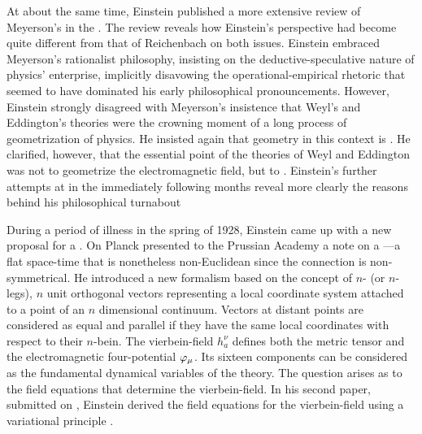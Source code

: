 \documentclass[final]{article}
\renewcommand{\me}{;~m.e.{}}
\newcommand{\nbein}{$n$-bein\xspace}
\newcommand{\vbein}{vierbein\xspace}
\newcommand{\hbein}{\ensuremath{h_{a}^{\nu}}\xspace}
\begin{document}
At about the same time, Einstein published a more extensive review of Meyerson's  \citep{Meyerson1925} in the . The review reveals how Einstein's perspective had become quite different from that of Reichenbach on both issues. Einstein embraced Meyerson's rationalist philosophy, insisting on the deductive-speculative nature of physics' enterprise, implicitly disavowing the operational-empirical rhetoric that seemed to have dominated his early philosophical pronouncements. However, Einstein strongly disagreed with Meyerson's insistence that Weyl's and Eddington's theories were the crowning moment of a long process of geometrization of physics. He insisted again that geometry in this context is  \citep[165\me]{Einstein1928b}. He clarified, however, that the essential point of the theories of Weyl and Eddington was not to geometrize the electromagnetic field, but to  \citep[165\me]{Einstein1928b}. Einstein's further attempts at \uft in the immediately following months reveal more clearly the reasons behind his philosophical turnabout \cite{Giovanelli2018a}

During a period of illness in the spring of 1928, Einstein came up with a new proposal for a \uft. On  Planck presented to the Prussian Academy a note on a  \citep{Einstein19281}---a flat space-time that is nonetheless non-Euclidean since the connection \Gtmn is non-symmetrical. He introduced a new formalism based on the concept of $n$- (or $n$-legs), $n$ unit orthogonal vectors representing a local coordinate system attached to a point of an $n$ dimensional continuum. Vectors at distant points are considered as equal and parallel if they have the same local coordinates with respect to their \nbein. The \vbein-field \hbein defines both the metric tensor \gmn and the electromagnetic four-potential $\varphi_{\mu}$. Its sixteen components can be considered as the fundamental dynamical variables of the theory. The question arises as to the field equations that determine the \vbein-field. In his second paper, submitted on , Einstein derived the field equations for the \vbein-field using a variational principle \citep{Einstein19282}.
\end{document}
